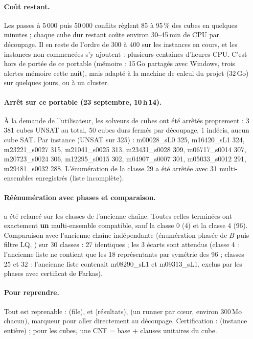 \paragraph{Coût restant.} Les passes à 5\,000 puis 50\,000 conflits règlent 85 à 95\,\% des cubes en quelques minutes ; chaque cube dur restant
coûte environ 30--45\,min de CPU par découpage. Il en reste de l'ordre de 300 à 400 sur les instances en cours, et les instances non commencées
s'y ajoutent : plusieurs centaines d'heures-CPU. C'est hors de portée de ce portable (mémoire : 15\,Go partagés avec Windows, trois alertes
mémoire cette nuit), mais adapté à la machine de calcul du projet (32\,Go) sur quelques jours, ou à un cluster.
\paragraph{Arrêt sur ce portable (23 septembre, 10\,h\,14).} À la demande de l'utilisateur, les solveurs de cubes ont été arrêtés proprement :
3\,381 cubes UNSAT au total, 50 cubes durs fermés par découpage, 1 indécis, aucun cube SAT. Par instance (UNSAT sur 325) : m00028\_sL0 325,
m16420\_sL1 324, m23221\_s0027 315, m21041\_s0025 313, m23431\_s0028 309, m06717\_s0014 307, m20723\_s0024 306, m12295\_s0015 302,
m04907\_s0007 301, m05033\_s0012 291, m29481\_s0032 288. L'énumération de la classe 29 a été arrêtée avec 31 multi-ensembles enregistrés (liste
incomplète).
\paragraph{Réénumération avec phases et comparaison.}  a été relancé sur les classes de l'ancienne chaîne.
Toutes celles terminées ont exactement \textbf{un} multi-ensemble compatible, sauf la classe 0 (4) et la classe 4 (96). Comparaison avec
l'ancienne chaîne indépendante (énumération phasée de $B$ puis filtre LQ, ) sur 30 classes : 27 identiques ;
les 3 écarts sont attendus (classe 4 : l'ancienne liste ne contient que les 18 représentants par symétrie des 96 ; classes 25 et 32 : l'ancienne
liste contenait m08290\_sL1 et m09313\_sL1, exclus par les phases avec certificat de Farkas).

\paragraph{Pour reprendre.} Tout est reprenable :  (file),  et 
(résultats),  (un runner par cœur, environ 300\,Mo chacun), marqueur  pour aller
directement au découpage. Certification :  (instance entière) ; pour les cubes, une CNF = base + clauses unitaires du cube.
